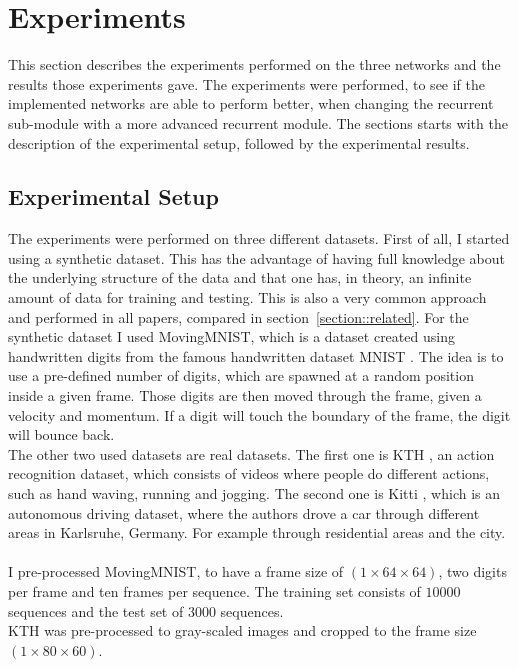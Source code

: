 \section{Experiments} \label{section::experiments}
 This section describes the experiments performed on the three networks and the results those experiments gave. The experiments were performed, to see if the 
 implemented networks are able to perform better, when changing the recurrent sub-module with a more advanced recurrent module. The sections starts with the  
 description of the experimental setup, followed by the experimental results.
 
 \subsection{Experimental Setup}
  The experiments were performed on three different datasets. First of all, I started using a synthetic dataset. This has the advantage of having full knowledge
  about the underlying structure of the data and that one has, in theory, an infinite amount of data for training and testing. This is also a very common approach
  and performed in all papers, compared in section~\ref{section::related}.
  For the synthetic dataset I used MovingMNIST, which is a dataset created using handwritten digits from the famous handwritten dataset MNIST
  \cite{LeCun1998}. The idea is to use a pre-defined number of digits, which are spawned at a random position inside a given frame. Those digits are then moved 
  through the frame, given a velocity and momentum. If a digit will touch the boundary of the frame, the digit will bounce back.\\
  The other two used datasets are real datasets. The first one is KTH \cite{Schuldt2004}, an action recognition dataset, which consists of videos where people
  do different actions, such as hand waving, running and jogging. The second one is Kitti \cite{Geiger2013}, which is an autonomous driving dataset, where
  the authors drove a car through different areas in Karlsruhe, Germany. For example through residential areas and the city.\\\\
  I pre-processed MovingMNIST, to have a frame size of $(1 \times 64 \times 64)$, two digits per frame and ten frames per sequence.
  The training set consists of $10000$ sequences and the test set of $3000$ sequences.\\
  KTH was pre-processed to gray-scaled images and cropped to the frame size $(1 \times 80 \times 60)$.\\
